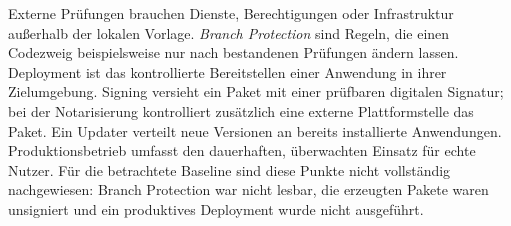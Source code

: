 \begin{beginnerstatement}

Externe Prüfungen brauchen Dienste, Berechtigungen oder Infrastruktur außerhalb
der lokalen Vorlage. \emph{Branch Protection} sind Regeln, die einen
Codezweig beispielsweise nur nach bestandenen Prüfungen ändern lassen.
Deployment ist das kontrollierte Bereitstellen einer Anwendung in ihrer
Zielumgebung. Signing versieht ein Paket mit einer prüfbaren digitalen
Signatur; bei der Notarisierung kontrolliert zusätzlich eine externe
Plattformstelle das Paket. Ein Updater verteilt neue Versionen an bereits
installierte Anwendungen. Produktionsbetrieb umfasst den dauerhaften,
überwachten Einsatz für echte Nutzer. Für die betrachtete Baseline sind diese
Punkte nicht vollständig nachgewiesen: Branch Protection war nicht lesbar,
die erzeugten Pakete waren unsigniert und ein produktives Deployment wurde
nicht ausgeführt.

\end{beginnerstatement}
